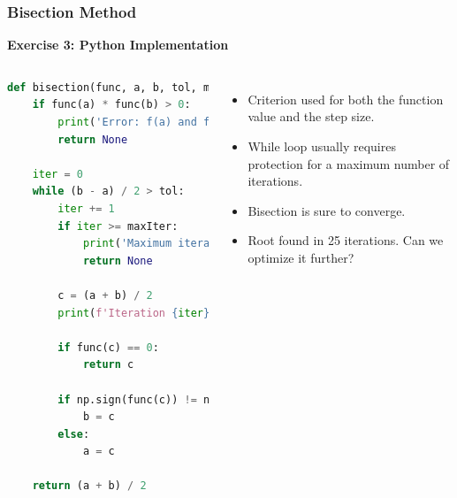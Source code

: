   \begin{frame}[fragile]
    \frametitle{Bisection Method}
  
    \textbf{Exercise 3: Python Implementation}
    \begin{columns}
      \begin{lstlisting}[language=Python,basicstyle=\tiny]
def bisection(func, a, b, tol, maxIter):
    if func(a) * func(b) > 0:
        print('Error: f(a) and f(b) must have different signs.')
        return None

    iter = 0
    while (b - a) / 2 > tol:
        iter += 1
        if iter >= maxIter:
            print('Maximum iterations reached')
            return None

        c = (a + b) / 2
        print(f'Iteration {iter}: Current estimate: {c}')

        if func(c) == 0:
            return c

        if np.sign(func(c)) != np.sign(func(a)):
            b = c
        else:
            a = c

    return (a + b) / 2
      \end{lstlisting}
  
      \vspace{-1cm}
      \begin{itemize}
      \item Criterion used for both the function value and the step size.
      \item While loop usually requires protection for a maximum number of iterations.
      \item Bisection is sure to converge.
      \item Root found in 25 iterations. Can we optimize it further?
    \end{itemize}
  \end{columns}
  \end{frame}
  
